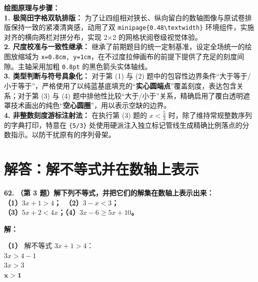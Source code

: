 \vspace{0.4cm}
{\small\color{blue!70!black}
\textbf{绘图原理与步骤：}\\
\textbf{1. 极简田字格双轨排版：} 为了让四组相对狭长、纵向留白的数轴图像与原试卷排版保持一致的紧凑清爽感，动用了双 \texttt{minipage\{0.48\textbackslash textwidth\}} 环境组件，实施对齐的横向两栏对拼分布，实现 2$\times$2 的网格状阅卷级视觉体验。\\
\textbf{2. 尺度校准与一致性继承：} 继承了前期题目的统一定制基准，设定全场统一的绘图放缩域为 \texttt{x=0.8cm, y=1cm}，在不过度拉伸画布的前提下提供了充足的刻度间隙。主轴采用加粗 \texttt{0.8pt} 的黑色箭头实体轴线。\\
\textbf{3. 类型判断与符号具象化：} 对于第 (1) 与 (2) 题中的包容性边界条件“大于等于/小于等于”，严格使用了以纯蓝基底填充的“\textbf{实心圆端点}”覆盖刻度，表达包含关系；对于第 (3) 与 (4) 题中排他性比较“大于/小于”关系，精确启用了覆白透明遮罩技术画出的纯色“\textbf{空心圆圈}”，用以表示空缺的边界。\\
\textbf{4. 非整数刻度游标注射法：} 在执行第 (3) 题的 $x < \frac{5}{3}$ 时，除了维持常规整数序列的字典打印，特意在 \texttt{\{5/3\}} 处使用硬派注入独立标记管线生成精确比例落点的分数指示。以防干扰原有的序列骨架。
}

\newpage


\section{解答：解不等式并在数轴上表示}

\vspace{0.6cm}

\textbf{\LARGE 62.} \textbf{（第 3 题）解下列不等式，并把它们的解集在数轴上表示出来：\\
（1）$3x+1 > 4$；\qquad\qquad\quad\, （2）$3-x < 3$；\\
（3）$5x+2 < 4x$；\qquad\qquad\quad （4）$3x-6 \geqslant 5x+10$。}

\vspace{0.4cm}
\textbf{解：}

\textbf{（1）} 解不等式 $3x+1 > 4$：\\
\hspace*{0.8cm} $3x > 4 - 1$\\
\hspace*{0.8cm} $3x > 3$\\
\hspace*{0.8cm} $\boldsymbol{x > 1}$

